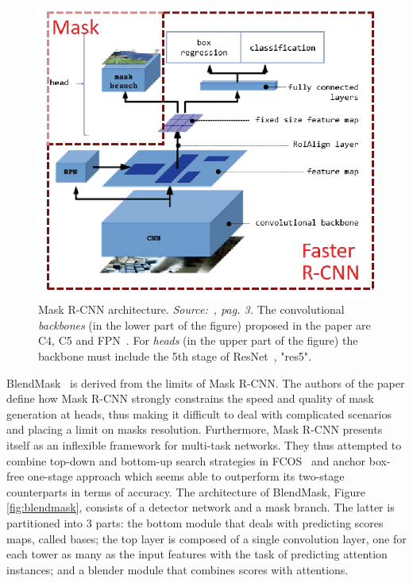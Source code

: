 \documentclass[10pt,twocolumn,letterpaper]{article}
\begin{document}
\begin{figure}[H]
\centering
  \includegraphics[width=0.70\linewidth]{./image/maskrcnn.png}
  \caption{Mask R-CNN architecture. \textit{Source:~\cite{fig1}, pag. 3.} The convolutional \textit{backbones} (in the lower part of the figure) proposed in the paper are C4, C5 and FPN~\cite{FPN}. For \textit{heads} (in the upper part of the figure) the backbone must include the 5th stage of ResNet~\cite{Authors5_ResNet}, "res5".}%
  \label{fig:mask_rcnn}

\noindent
\end{figure}
\indent BlendMask~\cite{Authors2_BlendMask} is derived from the limits of Mask R-CNN. The authors of the paper define how Mask R-CNN strongly constrains the speed and quality of mask generation at heads, thus making it difficult to deal with complicated scenarios and placing a limit on masks resolution. Furthermore, Mask R-CNN presents itself as an inflexible framework for multi-task networks. They thus attempted to combine top-down and bottom-up search strategies in FCOS~\cite{fcos} and anchor box-free one-stage approach which seems able to outperform its two-stage counterparts in terms of accuracy. The architecture of BlendMask, Figure \ref{fig:blendmask}, consists of a detector network and a mask branch. The latter is partitioned into 3 parts: the bottom module that deals with predicting scores maps, called bases; the top layer is composed of a single convolution layer, one for each tower as many as the input features with the task of predicting attention instances; and a blender module that combines scores with attentions.
\end{document}
